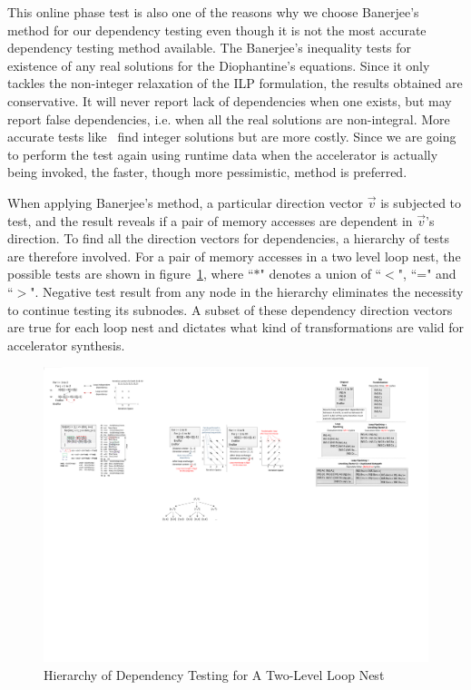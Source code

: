 This online phase test is also one of the reasons why we choose Banerjee's method for our dependency testing even though it is not the most accurate dependency testing method
available. The Banerjee's inequality tests for existence of any real solutions for the Diophantine's equations. Since it only tackles the non-integer relaxation of the ILP formulation, the results obtained are conservative.
It will never report lack of dependencies when one exists,  but may report false dependencies, i.e. when all the real solutions are non-integral.
 More accurate tests like~\cite{omega} find integer solutions but are more costly. Since we are
going to perform the test again using runtime data when the accelerator is actually
being invoked, the faster, though more pessimistic, method is preferred.

When applying Banerjee's method, a particular direction vector $\vec{v}$ is subjected to test, and the result reveals if a pair of memory accesses are dependent in $\vec{v}$'s direction. 
To find all the direction vectors for dependencies, a hierarchy
of tests are therefore involved. For a pair of memory accesses in a two level loop nest, the possible tests are shown in figure~\ref{fig:testingHier}, where ``$\ast$" denotes a union of ``$<$", ``=" and ``$>$". Negative test result from any node in the hierarchy eliminates the necessity to continue testing its subnodes. A subset of these dependency direction vectors
are true for each loop nest and dictates what kind of transformations are valid for accelerator synthesis.


\begin{figure}[htp]
\begin{center}
\includegraphics[width=0.6\linewidth]{chap6fig/testingHier.pdf}
\caption{Hierarchy of Dependency Testing for A Two-Level Loop Nest
\label{fig:testingHier}}
\end{center}
\end{figure}



